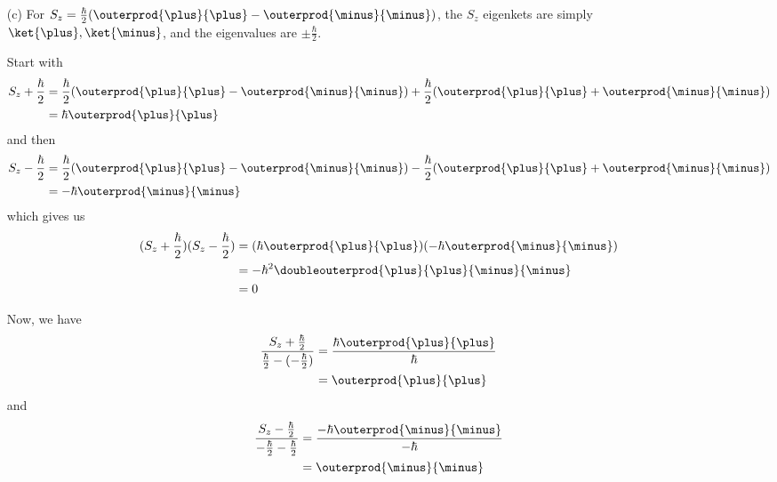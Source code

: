 \begin{itemize}
\item[(c)]
For $S_z = \frac{\hbar}{2}(\outerprod{\plus}{\plus} -
\outerprod{\minus}{\minus})$, the $S_z$ eigenkets are simply
$\ket{\plus},\ket{\minus}$, and the eigenvalues are $\pm\frac{\hbar}{2}$.

Start with
\begin{align*}
  S_z + \frac{\hbar}{2}
  &=
  \frac{\hbar}{2}(\outerprod{\plus}{\plus} - \outerprod{\minus}{\minus})
  +\frac{\hbar}{2}(\outerprod{\plus}{\plus} + \outerprod{\minus}{\minus}) \\
  &=
  \hbar\outerprod{\plus}{\plus}
\end{align*}
and then
\begin{align*}
  S_z - \frac{\hbar}{2}
  &=
  \frac{\hbar}{2}(\outerprod{\plus}{\plus} - \outerprod{\minus}{\minus}) -
  \frac{\hbar}{2}(\outerprod{\plus}{\plus} + \outerprod{\minus}{\minus}) \\
  &=
  -\hbar\outerprod{\minus}{\minus}
\end{align*}
which gives us
\begin{align*}
  (S_z + \frac{\hbar}{2})(S_z - \frac{\hbar}{2}) &=
  (\hbar\outerprod{\plus}{\plus})(-\hbar\outerprod{\minus}{\minus}) \\
  &=
  -\hbar^2\doubleouterprod{\plus}{\plus}{\minus}{\minus} \\
  &=
  0
\end{align*}

Now, we have
\begin{align*}
  \frac{S_z + \frac{\hbar}{2}}{\frac{\hbar}{2} - (-\frac{\hbar}{2})}
  &=
  \frac{\hbar\outerprod{\plus}{\plus}}{\hbar} \\
  &=
  \outerprod{\plus}{\plus}
\end{align*}
and
\begin{align*}
  \frac{S_z - \frac{\hbar}{2}}{-\frac{\hbar}{2} - \frac{\hbar}{2}}
  &=
  \frac{-\hbar\outerprod{\minus}{\minus}}{-\hbar} \\
  &=
  \outerprod{\minus}{\minus}
\end{align*}

\end{itemize}
